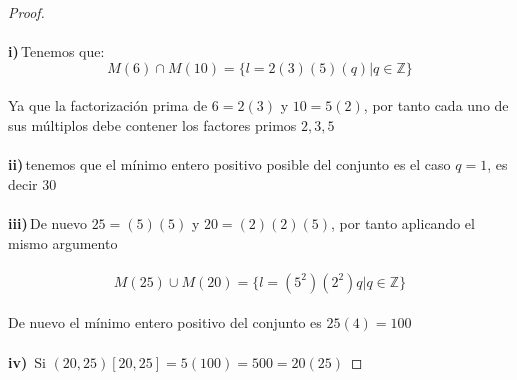 \documentclass[11pt,letterpaper]{article}
\newcommand{\Z}{\mathbb{Z}}
\begin{document}
\begin{proof}\,\\
    \,\\
    \textbf{i)}\,Tenemos que:\,\\
    \begin{equation*}
        M(6)\cap M(10)=\{l=2(3)(5)(q)|q\in \Z\}
    \end{equation*}\,\\
    Ya que la factorizaci\'on prima de $6=2(3)$ y $10=5(2)$, por tanto cada uno de 
    sus m\'ultiplos debe contener los factores primos $2,3,5$\,\\
    \,\\
    \textbf{ii)}\,tenemos que el m\'inimo entero positivo posible del conjunto es el caso $q=1$, es decir $30$\,\\
    \,\\
    \textbf{iii)}\,De nuevo $25=(5)(5)$ y $20=(2)(2)(5)$, por tanto aplicando el mismo argumento\,\\
    \,\\
    \begin{equation*}
        M(25)\cup M(20)=\{l=(5^2)(2^2)q|q\in \Z\}
    \end{equation*}\,\\
    De nuevo el m\'inimo entero positivo del conjunto es $25(4)=100$\,\\
    \,\\
    \textbf{iv)}\, Si $(20,25)[20,25]=5(100)=500=20(25)$
\end{proof}
\newpage
{}\,\\
\end{document}
